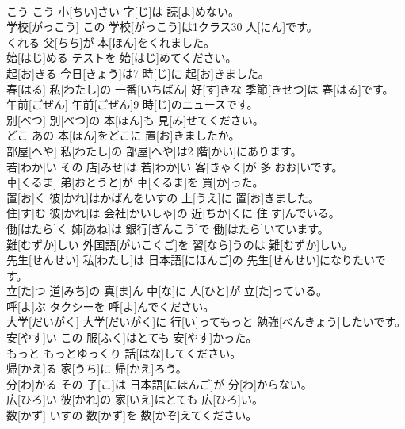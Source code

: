\documentclass[8pt]{extreport}
\begin{document}
\begin{CJK}{UTF8}{min}
\\	こう	こう 小[ちい]さい 字[じ]は 読[よ]めない。		
\\	学校[がっこう]	この 学校[がっこう]は1クラス30 人[にん]です。		
\\	くれる	父[ちち]が 本[ほん]をくれました。		
\\	始[はじ]める	テストを 始[はじ]めてください。		
\\	起[お]きる	今日[きょう]は7 時[じ]に 起[お]きました。		
\\	春[はる]	私[わたし]の 一番[いちばん] 好[す]きな 季節[きせつ]は 春[はる]です。		
\\	午前[ごぜん]	午前[ごぜん]9 時[じ]のニュースです。		
\\	別[べつ]	別[べつ]の 本[ほん]も 見[み]せてください。		
\\	どこ	あの 本[ほん]をどこに 置[お]きましたか。		
\\	部屋[へや]	私[わたし]の 部屋[へや]は2 階[かい]にあります。		
\\	若[わか]い	その 店[みせ]は 若[わか]い 客[きゃく]が 多[おお]いです。		
\\	車[くるま]	弟[おとうと]が 車[くるま]を 買[か]った。		
\\	置[お]く	彼[かれ]はかばんをいすの 上[うえ]に 置[お]きました。		
\\	住[す]む	彼[かれ]は 会社[かいしゃ]の 近[ちか]くに 住[す]んでいる。		
\\	働[はたら]く	姉[あね]は 銀行[ぎんこう]で 働[はたら]いています。		
\\	難[むずか]しい	外国語[がいこくご]を 習[なら]うのは 難[むずか]しい。		
\\	先生[せんせい]	私[わたし]は 日本語[にほんご]の 先生[せんせい]になりたいです。		
\\	立[た]つ	道[みち]の 真[ま]ん 中[な]に 人[ひと]が 立[た]っている。		
\\	呼[よ]ぶ	タクシーを 呼[よ]んでください。		
\\	大学[だいがく]	大学[だいがく]に 行[い]ってもっと 勉強[べんきょう]したいです。		
\\	安[やす]い	この 服[ふく]はとても 安[やす]かった。		
\\	もっと	もっとゆっくり 話[はな]してください。		
\\	帰[かえ]る	家[うち]に 帰[かえ]ろう。		
\\	分[わ]かる	その 子[こ]は 日本語[にほんご]が 分[わ]からない。		
\\	広[ひろ]い	彼[かれ]の 家[いえ]はとても 広[ひろ]い。		
\\	数[かず]	いすの 数[かず]を 数[かぞ]えてください。		

\end{CJK}
\end{document}
